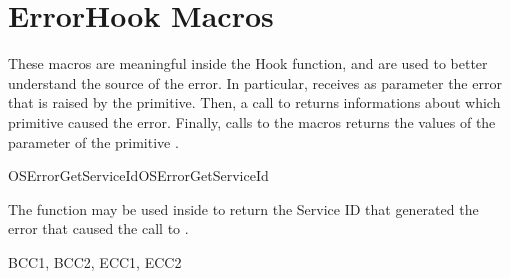 
\section{ErrorHook Macros}
\label{sec:errorhook-macros}
These macros are meaningful inside the  Hook
function, and are used to better understand the source of the
error. In particular,  receives as parameter the
error that is raised by the primitive. Then, a call to
 returns informations about which
primitive caused the error. Finally, calls to the macros
 returns the values of the  parameter
of the primitive .


\begin{function_nopb2}{OSErrorGetServiceId}{OSErrorGetServiceId}
  \begin{fundescription}
    The function may be used inside  to return the
    Service ID that generated the error that caused the call to
    .
  \end{fundescription}
  \begin{funreturn}
  \end{funreturn}
  \begin{funconformance}
    BCC1, BCC2, ECC1, ECC2
  \end{funconformance}
\end{function_nopb2}


